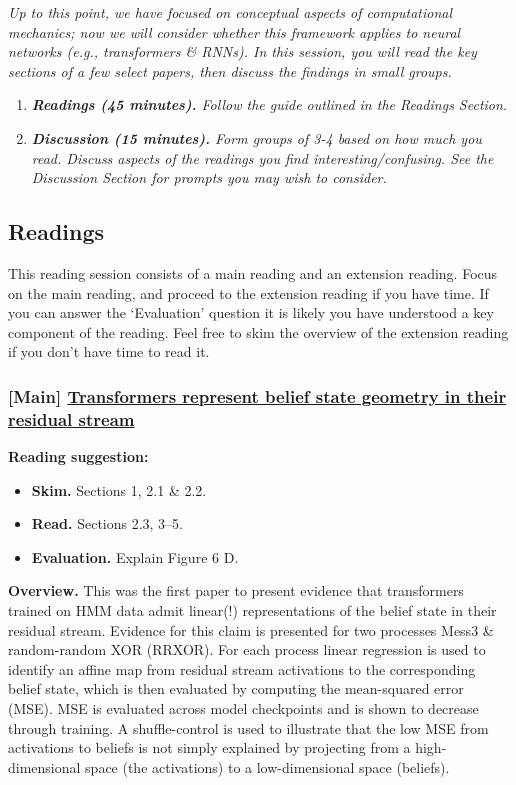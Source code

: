 \emph{Up to this point, we have focused on conceptual aspects of computational mechanics; now we will consider whether this framework applies to neural networks (e.g., transformers \& RNNs). In this session, you will read the key sections of a few select papers, then discuss the findings in small groups.}

\begin{enumerate}
\item
  \emph{\textbf{Readings (45 minutes).} Follow the guide outlined in the Readings Section.}
\item
  \emph{\textbf{Discussion (15 minutes).} Form groups of 3-4 based on how much you read. Discuss aspects of the readings you find interesting/confusing. See the Discussion Section for prompts you may wish to consider.}
\end{enumerate}

\subsection{Readings }\label{readings}

This reading session consists of a main reading and an extension reading. Focus on the main reading, and proceed to the extension reading if you have time. If you can answer the `Evaluation' question it is likely you have understood a key component of the reading. Feel free to skim the overview of the extension reading if you don't have time to read it.

\subsubsection{[Main] \href{https://arxiv.org/pdf/2405.15943}{Transformers represent belief state geometry in their residual stream}}\label{main-transformers-represent-belief-state-geometry-in-their-residual-stream}

\textbf{Reading suggestion:}

\begin{itemize}
\item
  \textbf{Skim.} Sections 1, 2.1 \& 2.2.
\item
  \textbf{Read.} Sections 2.3, 3--5.
\item
  \textbf{Evaluation.} Explain Figure 6 D.
\end{itemize}

\textbf{Overview.} This was the first paper to present evidence that transformers trained on HMM data admit linear(!) representations of the belief state in their residual stream. Evidence for this claim is presented for two processes Mess3 \& random-random XOR (RRXOR). For each process linear regression is used to identify an affine map from residual stream activations to the corresponding belief state, which is then evaluated by computing the mean-squared error (MSE). MSE is evaluated across model checkpoints and is shown to decrease through training. A shuffle-control is used to illustrate that the low MSE from activations to beliefs is not simply explained by projecting from a high-dimensional space (the activations) to a low-dimensional space (beliefs).

